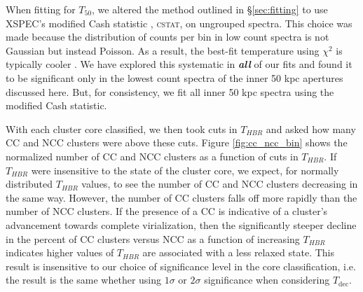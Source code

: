 \documentclass[12pt,preprint]{aastex}
\begin{document}
When fitting for $T_{50}$, we altered the method outlined
in \S\ref{sec:fitting} to use {\textsc{XSPEC}}'s modified Cash statistic
\citep{1979ApJ...228..939C}, {\textsc{cstat}}, on ungrouped
spectra. This choice was made because the distribution of counts per
bin in low count spectra is not Gaussian but instead
Poisson. As a result, the best-fit temperature using $\chi^2$ is
typically cooler \citep{1989ApJ...342.1207N, 2007A&A...462..429B}. We
have explored this systematic in {\bfseries\em{all}} of our fits and
found it to be significant only in the lowest count spectra of the
inner 50 kpc apertures discussed here. But, for consistency, we fit all
inner 50 kpc spectra using the modified Cash statistic.

With each cluster core classified, we then took cuts in $T_{HBR}$ 
and asked how many CC and NCC clusters were above these cuts. 
Figure \ref{fig:cc_ncc_bin} shows the normalized number of CC and NCC
clusters as a function of cuts in $T_{HBR}$. If $T_{HBR}$ were
insensitive to the state of the cluster core, we expect, for normally
distributed $T_{HBR}$ values, to see the number of CC and NCC clusters
decreasing in the same way. However, the number of CC clusters falls
off more rapidly than the number of NCC clusters. If the presence of a
CC is indicative of a cluster's advancement towards complete
virialization, then the significantly steeper decline in the percent
of CC clusters versus NCC as a function of increasing $T_{HBR}$
indicates higher values of $T_{HBR}$ are associated with a less
relaxed state. This result is insensitive to our choice of
significance level in the core classification, i.e. the result is the
same whether using $1\sigma$ or $2\sigma$ significance when
considering $T_{\mathrm{dec}}$.
\end{document}
